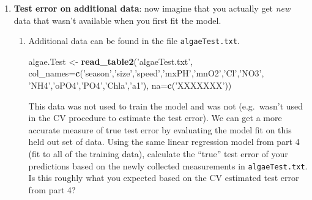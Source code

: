 \documentclass[]{article}
\newenvironment{Shaded}{\begin{snugshade}}{\end{snugshade}}
\newcommand{\KeywordTok}[1]{\textcolor[rgb]{0.13,0.29,0.53}{\textbf{#1}}}
\newcommand{\DataTypeTok}[1]{\textcolor[rgb]{0.13,0.29,0.53}{#1}}
\newcommand{\StringTok}[1]{\textcolor[rgb]{0.31,0.60,0.02}{#1}}
\newcommand{\NormalTok}[1]{#1}
\begin{document}
\begin{enumerate}
\def\labelenumi{\arabic{enumi}.}
\setcounter{enumi}{4}
\item
  \textbf{Test error on additional data}: now imagine that you actually
  get \emph{new} data that wasn't available when you first fit the
  model.

  \begin{enumerate}
  \item
    Additional data can be found in the file \texttt{algaeTest.txt}.

\begin{Shaded}
\begin{Highlighting}[]
\NormalTok{algae.Test <-}\StringTok{ }\KeywordTok{read_table2}\NormalTok{(}\StringTok{'algaeTest.txt'}\NormalTok{,}
                    \DataTypeTok{col_names=}\KeywordTok{c}\NormalTok{(}\StringTok{'season'}\NormalTok{,}\StringTok{'size'}\NormalTok{,}\StringTok{'speed'}\NormalTok{,}\StringTok{'mxPH'}\NormalTok{,}\StringTok{'mnO2'}\NormalTok{,}\StringTok{'Cl'}\NormalTok{,}\StringTok{'NO3'}\NormalTok{,}
                                \StringTok{'NH4'}\NormalTok{,}\StringTok{'oPO4'}\NormalTok{,}\StringTok{'PO4'}\NormalTok{,}\StringTok{'Chla'}\NormalTok{,}\StringTok{'a1'}\NormalTok{),}
                    \DataTypeTok{na=}\KeywordTok{c}\NormalTok{(}\StringTok{'XXXXXXX'}\NormalTok{))}
\end{Highlighting}
\end{Shaded}

    This data was not used to train the model and was not (e.g.~wasn't
    used in the CV procedure to estimate the test error). We can get a
    more accurate measure of true test error by evaluating the model fit
    on this held out set of data. Using the same linear regression model
    from part 4 (fit to all of the training data), calculate the
    ``true'' test error of your predictions based on the newly collected
    measurements in \texttt{algaeTest.txt}. Is this roughly what you
    expected based on the CV estimated test error from part 4?
  \end{enumerate}
\end{enumerate}
\end{document}
